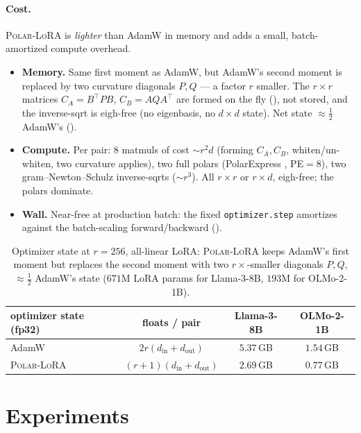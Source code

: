 \documentclass[11pt]{article}
\newcommand{\methodname}{\textsc{Polar-LoRA}\xspace}
\theoremstyle{plain}
\theoremstyle{definition}
\theoremstyle{remark}
\begin{document}
\paragraph{Cost.} \methodname{} is \emph{lighter} than AdamW in memory and adds a small, batch-amortized compute overhead.
\begin{itemize}[leftmargin=1.5em,itemsep=1pt,topsep=2pt]
  \item \textbf{Memory.} Same first moment as AdamW, but AdamW's second moment is replaced by two curvature diagonals $P,Q$ --- a factor $r$ smaller. The $r\times r$ matrices $C_A=B^\top PB$, $C_B=AQA^\top$ are formed on the fly (), not stored, and the inverse-sqrt is eigh-free (no eigenbasis, no $d\times d$ state). Net state ${\approx}\tfrac12$ AdamW's ().
  \item \textbf{Compute.} Per pair: $8$ matmuls of cost ${\sim}r^2d$ (forming $C_A,C_B$, whiten/un-whiten, two curvature applies), two full polars (PolarExpress \cite{polarexpress}, PE${=}8$), two gram--Newton--Schulz inverse-sqrts \cite{gram_ns} (${\sim}r^3$). All $r\times r$ or $r\times d$, eigh-free; the polars dominate.
  \item \textbf{Wall.} Near-free at production batch: the fixed \texttt{optimizer.step} amortizes against the batch-scaling forward/backward ().
\end{itemize}
\begin{table}[h]
\centering\small
\begin{tabular}{lccc}
\toprule
optimizer state (fp32) & floats / pair & Llama-3-8B & OLMo-2-1B \\
\midrule
AdamW         & $2r(d_{\mathrm{in}}{+}d_{\mathrm{out}})$     & $5.37$\,GB & $1.54$\,GB \\
\methodname{} & $(r{+}1)(d_{\mathrm{in}}{+}d_{\mathrm{out}})$ & $2.69$\,GB & $0.77$\,GB \\
\bottomrule
\end{tabular}
\caption{Optimizer state at $r{=}256$, all-linear LoRA: \methodname{} keeps AdamW's first moment but replaces the second moment with two $r{\times}$-smaller diagonals $P,Q$, ${\approx}\tfrac12$ AdamW's state ($671$M LoRA params for Llama-3-8B, $193$M for OLMo-2-1B).}
\label{tab:optstate}
\end{table}

\section{Experiments}
\label{sec:exp}
\end{document}
